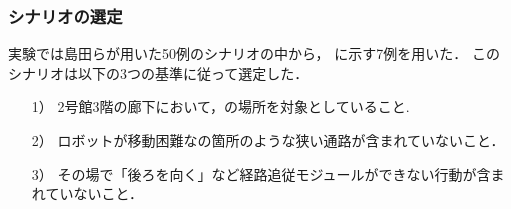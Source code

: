 \subsubsection{シナリオの選定}
実験では島田らが用いた50例のシナリオの中から，
に示す7例を用いた．
このシナリオは以下の3つの基準に従って選定した．
\begin{enumerate}
    \item [1）] 2号館3階の廊下において，の場所を対象としていること.
    \item [2）] ロボットが移動困難なの箇所のような狭い通路が含まれていないこと．
    \item [3）] その場で「後ろを向く」など経路追従モジュールができない行動が含まれていないこと．
\end{enumerate}

